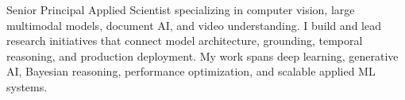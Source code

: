 \par{
Senior Principal Applied Scientist specializing in computer vision, large multimodal models, document AI, and video understanding. I build and lead research initiatives that connect model architecture, grounding, temporal reasoning, and production deployment. My work spans deep learning, generative AI, Bayesian reasoning, performance optimization, and scalable applied ML systems.
}
